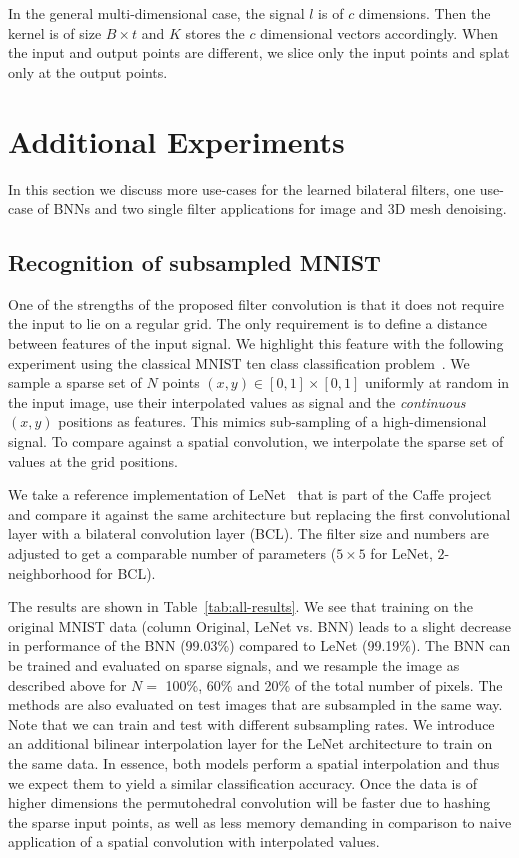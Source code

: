 In the general multi-dimensional case, the signal $l$ is of $c$ dimensions. Then
the kernel is of size $B\times t$ and $K$ stores the $c$ dimensional vectors
accordingly. When the input and output points are different, we slice only the
input points and splat only at the output points.


\section{Additional Experiments}
\label{sec:addexps}
In this section we discuss more use-cases for the learned bilateral filters, one
use-case of BNNs and two single filter applications for image and 3D mesh denoising.

\subsection{Recognition of subsampled MNIST}\label{sec:app_mnist}

One of the strengths of the proposed filter convolution is that it does not
require the input to lie on a regular grid. The only requirement is to define a distance
between features of the input signal.
We highlight this feature with the following experiment using the
classical MNIST ten class classification problem~\cite{lecun1998mnist}. We sample a
sparse set of $N$ points $(x,y)\in [0,1]\times [0,1]$
uniformly at random in the input image, use their interpolated values
as signal and the \emph{continuous} $(x,y)$ positions as features. This mimics
sub-sampling of a high-dimensional signal. To compare against a spatial convolution,
we interpolate the sparse set of values at the grid positions.

We take a reference implementation of LeNet~\cite{lecun1998gradient} that
is part of the Caffe project~\cite{jia2014caffe} and compare it
against the same architecture but replacing the first convolutional
layer with a bilateral convolution layer (BCL). The filter size
and numbers are adjusted to get a comparable number of parameters
($5\times 5$ for LeNet, $2$-neighborhood for BCL).

The results are shown in Table~\ref{tab:all-results}. We see that training
on the original MNIST data (column Original, LeNet vs. BNN) leads to a slight
decrease in performance of the BNN (99.03\%) compared to LeNet
(99.19\%). The BNN can be trained and evaluated on sparse
signals, and we resample the image as described above for $N=$ 100\%, 60\% and
20\% of the total number of pixels. The methods are also evaluated
on test images that are subsampled in the same way. Note that we can
train and test with different subsampling rates. We introduce an additional
bilinear interpolation layer for the LeNet architecture to train on the same
data. In essence, both models perform a spatial interpolation and thus we
expect them to yield a similar classification accuracy. Once the data is of
higher dimensions the permutohedral convolution will be faster due to hashing
the sparse input points, as well as less memory demanding in comparison to
naive application of a spatial convolution with interpolated values.

